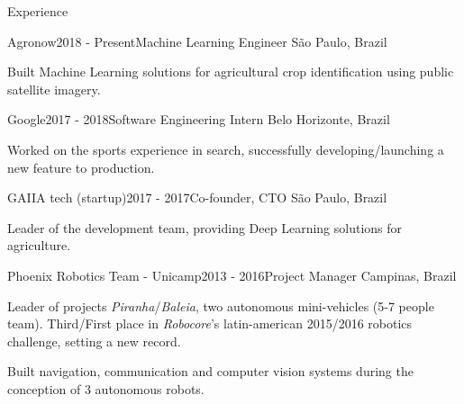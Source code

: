 \documentclass[8pt]{resume}
\newcommand{\tit}[1]{\textit{#1}}
\begin{document}
\begin{rSection}{Experience}

\begin{rSubsection}{Agronow}{2018 - Present}{Machine Learning Engineer}
    {São Paulo, Brazil}
\item Built Machine Learning solutions for agricultural crop identification
        using public satellite imagery.
\end{rSubsection}

\begin{rSubsection}{Google}{2017 - 2018}{Software Engineering Intern}
    {Belo Horizonte, Brazil}
    \item Worked on the sports experience in search, successfully developing/launching a new feature to production.
\end{rSubsection}

\begin{rSubsection}{GAIIA tech (startup)}{2017 - 2017}{Co-founder, CTO}
    {São Paulo, Brazil}
    \item Leader of the development team, providing Deep Learning solutions for agriculture.
\end{rSubsection}

\begin{rSubsection}{Phoenix Robotics Team - Unicamp}{2013 - 2016}{Project Manager}
    {Campinas, Brazil}
\item Leader of projects \tit{Piranha}/\tit{Baleia},
        two autonomous mini-vehicles (5-7 people team).
        Third/First place in \tit{Robocore}'s latin-american 2015/2016 robotics
        challenge, setting a new record.
    \item Built navigation, communication and computer vision systems
        during the conception of 3 autonomous robots.
\end{rSubsection}


\end{rSection}
\end{document}
